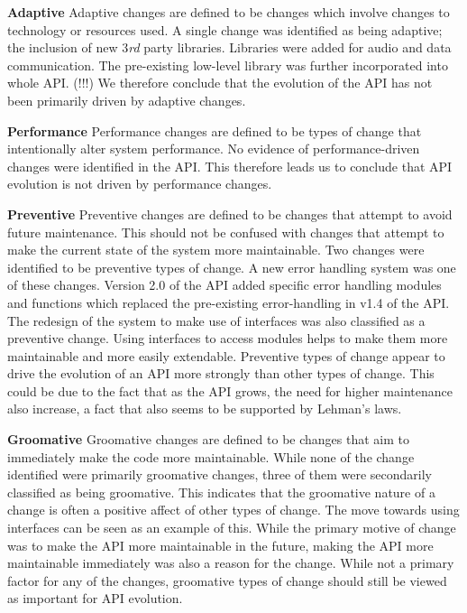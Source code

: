 \documentclass{sig-alternate}
\begin{document}
\smallskip \noindent
\textbf{Adaptive  }
Adaptive changes are defined to be changes which involve changes to technology or resources used. 
A single change was identified as being adaptive; the inclusion of new 3\textit{rd} party libraries. Libraries were added for audio and data communication. The pre-existing low-level library was further incorporated into whole API. (!!!)
We therefore conclude that the evolution of the API has not been primarily driven by adaptive changes.

\smallskip \noindent
\textbf{Performance  }
Performance changes are defined to be types of change that intentionally alter system performance.
No evidence of performance-driven changes were identified in the API.
This therefore leads us to conclude that API evolution is not driven by performance changes.

\smallskip \noindent
\textbf{Preventive  }
Preventive changes are defined to be changes that attempt to avoid future maintenance. This should not be confused with changes that attempt to make the current state of the system more maintainable.
Two changes were identified to be preventive types of change. A new error handling system was one of these changes. Version 2.0 of the API added specific error handling modules and functions which replaced the pre-existing error-handling in v1.4 of the API. The redesign of the system to make use of interfaces was also classified as a preventive change. Using interfaces to access modules helps to make them more maintainable and more easily extendable.
Preventive types of change appear to drive the evolution of an API more strongly than other types of change. This could be due to the fact that as the API grows, the need for higher maintenance also increase, a fact that also seems to be supported by Lehman's laws.

\smallskip \noindent
\textbf{Groomative  }
Groomative changes are defined to be changes that aim to immediately make the code more maintainable.
While none of the change identified were primarily groomative changes, three of them were secondarily classified as being groomative. This indicates that the groomative nature of a change is often a positive affect of other types of change. The move towards using interfaces can be seen as an example of this. While the primary motive of change was to make the API more maintainable in the future, making the API more maintainable immediately was also a reason for the change.
While not a primary factor for any of the changes, groomative types of change should still be viewed as important for API evolution.
\end{document}
